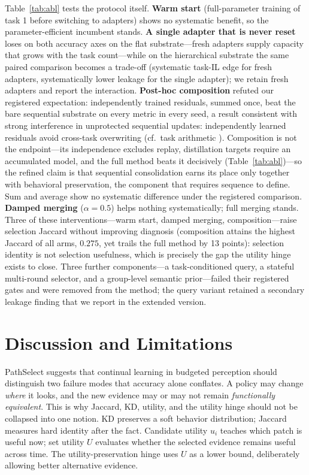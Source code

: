 \documentclass{article}
\begin{document}
Table~\ref{tab:abl} tests the protocol itself.
\textbf{Warm start} (full-parameter training of task 1 before switching to adapters) shows no systematic benefit, so the parameter-efficient incumbent stands.
\textbf{A single adapter that is never reset} loses on both accuracy axes on the flat substrate---fresh adapters supply capacity that grows with the task count---while on the hierarchical substrate the same paired comparison becomes a trade-off (systematic task-IL edge for fresh adapters, systematically lower leakage for the single adapter); we retain fresh adapters and report the interaction.
\textbf{Post-hoc composition} refuted our registered expectation: independently trained residuals, summed once, beat the bare sequential substrate on every metric in every seed, a result consistent with strong interference in unprotected sequential updates: independently learned residuals avoid cross-task overwriting (cf.\ task arithmetic \cite{ilharco2023task}). Composition is not the endpoint---its independence excludes replay, distillation targets require an accumulated model, and the full method beats it decisively (Table~\ref{tab:abl})---so the refined claim is that sequential consolidation earns its place only together with behavioral preservation, the component that requires sequence to define. Sum and average show no systematic difference under the registered comparison.
\textbf{Damped merging} ($\alpha{=}0.5$) helps nothing systematically; full merging stands.
Three of these interventions---warm start, damped merging, composition---raise selection Jaccard without improving diagnosis (composition attains the highest Jaccard of all arms, $0.275$, yet trails the full method by 13 points): selection identity is not selection usefulness, which is precisely the gap the utility hinge exists to close.
Three further components---a task-conditioned query, a stateful multi-round selector, and a group-level semantic prior---failed their registered gates and were removed from the method; the query variant retained a secondary leakage finding that we report in the extended version.

\section{Discussion and Limitations}
\label{sec:discussion}

PathSelect suggests that continual learning in budgeted perception should distinguish two failure modes that accuracy alone conflates.
A policy may change \emph{where} it looks, and the new evidence may or may not remain \emph{functionally equivalent}.
This is why Jaccard, KD, utility, and the utility hinge should not be collapsed into one notion.
KD preserves a soft behavior distribution; Jaccard measures hard identity after the fact.
Candidate utility $u_i$ teaches which patch is useful now; set utility $U$ evaluates whether the selected evidence remains useful across time.
The utility-preservation hinge uses $U$ as a lower bound, deliberately allowing better alternative evidence.
\end{document}
